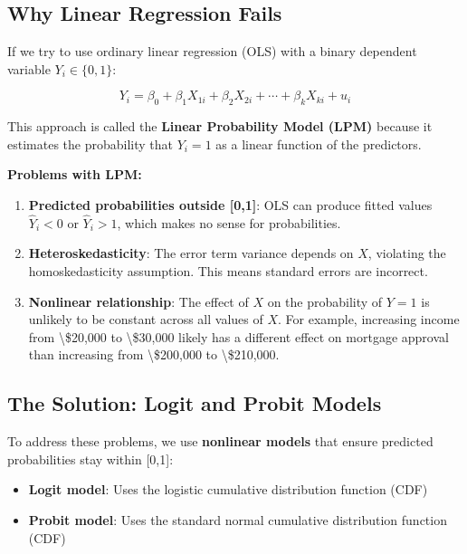 \documentclass[
  12pt,
  letterpaper,
]{scrbook}
\providecommand{\tightlist}{%
  \setlength{\itemsep}{0pt}\setlength{\parskip}{0pt}}
\renewcommand{\tightlist}{\setlength{\itemsep}{0.5\baselineskip}\setlength{\parskip}{0.2\baselineskip}}
\theoremstyle{definition}
\theoremstyle{plain}
\theoremstyle{remark}
\begin{document}
\subsection{Why Linear Regression
Fails}\label{why-linear-regression-fails}

If we try to use ordinary linear regression (OLS) with a binary
dependent variable \(Y_i \in \{0,1\}\):

\[
Y_i = \beta_0 + \beta_1 X_{1i} + \beta_2 X_{2i} + \cdots + \beta_k X_{ki} + u_i
\]

This approach is called the \textbf{Linear Probability Model (LPM)}
because it estimates the probability that \(Y_i = 1\) as a linear
function of the predictors.

\textbf{Problems with LPM:}

\begin{enumerate}
\def\labelenumi{\arabic{enumi}.}
\item
  \textbf{Predicted probabilities outside {[}0,1{]}}: OLS can produce
  fitted values \(\hat{Y}_i < 0\) or \(\hat{Y}_i > 1\), which makes no
  sense for probabilities.
\item
  \textbf{Heteroskedasticity}: The error term variance depends on \(X\),
  violating the homoskedasticity assumption. This means standard errors
  are incorrect.
\item
  \textbf{Nonlinear relationship}: The effect of \(X\) on the
  probability of \(Y=1\) is unlikely to be constant across all values of
  \(X\). For example, increasing income from \textbackslash\$20,000 to
  \textbackslash\$30,000 likely has a different effect on mortgage
  approval than increasing from \textbackslash\$200,000 to
  \textbackslash\$210,000.
\end{enumerate}

\subsection{The Solution: Logit and Probit
Models}\label{the-solution-logit-and-probit-models}

To address these problems, we use \textbf{nonlinear models} that ensure
predicted probabilities stay within {[}0,1{]}:

\begin{itemize}
\tightlist
\item
  \textbf{Logit model}: Uses the logistic cumulative distribution
  function (CDF)
\item
  \textbf{Probit model}: Uses the standard normal cumulative
  distribution function (CDF)
\end{itemize}
\end{document}
